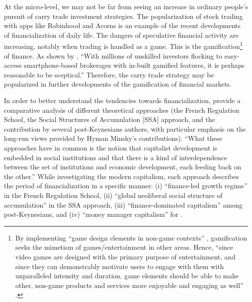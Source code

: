 \documentclass[a4paper, twoside]{templates/ociamthesis}
\begin{document}
At the micro-level, we may not be far from seeing an increase in ordinary people's pursuit of carry trade investment strategies. The popularization of stock trading with apps like Robinhood and Acorns is an example of the recent developments of financialization of daily life. The dangers of speculative financial activity are increasing, notably when trading is handled as a game. This is the gamification\footnote{By implementing ``game design elements in non-game contexts'' \autocite[ 2]{deterding2011}, gamification seeks the mimetism of games/entertainment in other areas. Hence, ``since video games are designed with the primary purpose of entertainment, and since they can demonstrably motivate users to engage with them with unparalleled intensity and duration, game elements should be able to make other, non-game products and services more enjoyable and engaging as well'' \autocite[ 1]{deterding2011}.} of finance. As shown by \textcite[ 13]{heide2021}, ``With millions of unskilled investors flocking to easy-access smartphone-based brokerages with in-built gamified features, it is perhaps reasonable to be sceptical.'' Therefore, the carry trade strategy may be popularized in further developments of the gamification of financial markets.

In order to better understand the tendencies towards financialization, \textcite{hein2015c} provide a comparative analysis of different theoretical approaches (the French Regulation School, the Social Structures of Accumulation {[}SSA{]} approach, and the contribution by several post-Keynesians authors, with particular emphasis on the long-run views provided by Hyman Minsky's contributions). ``What these approaches have in common is the notion that capitalist development is embedded in social institutions and that there is a kind of interdependence between the set of institutions and economic development, each feeding back on the other.'' \autocite[ 7]{hein2015c} While investigating the modern capitalism, each approach describes the period of financialization in a specific manner: (i) ``finance-led growth regime'' \autocite{boyer2000} in the French Regulation School, (ii) ``global neoliberal social structure of accumulation'' \autocite{tabb2010} in the SSA approach, (iii) ``finance-dominated capitalism'' \autocite{hein2012} among post-Keynesians, and (iv) ``money manager capitalism'' for \textcite{minsky1996}.
\end{document}
